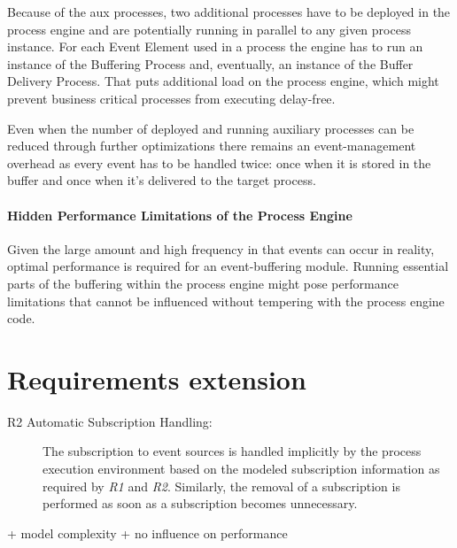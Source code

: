 Because of the aux processes, two additional processes have to be deployed in the process engine and are potentially running in parallel to any given process instance. For each Event Element used in a process the engine has to run an instance of the Buffering Process and, eventually, an instance of the Buffer Delivery Process.
That puts additional load on the process engine, which might prevent business critical processes from executing delay-free.

Even when the number of deployed and running auxiliary processes can be reduced through further optimizations there remains an event-management overhead as every event has to be handled twice: once when it is stored in the buffer and once when it's delivered to the target process.

\paragraph{Hidden Performance Limitations of the Process Engine\newline}

Given the large amount and high frequency in that events can occur in reality, optimal performance is required for an event-buffering module.
Running essential parts of the buffering within the process engine might pose performance limitations that cannot be influenced without tempering with the process engine code.

\medskip \noindent
{}


\section{Requirements extension}\label{ch:ass:reqextension}
\begin{description}
	\item[R2 Automatic Subscription Handling:] 
	The subscription to event sources is handled implicitly by the process execution environment based on the modeled subscription information as required by \textit{R1} and \textit{R2}. Similarly, the removal of a subscription is performed as soon as a subscription becomes unnecessary.	
\end{description}

+ model complexity
+ no influence on performance

